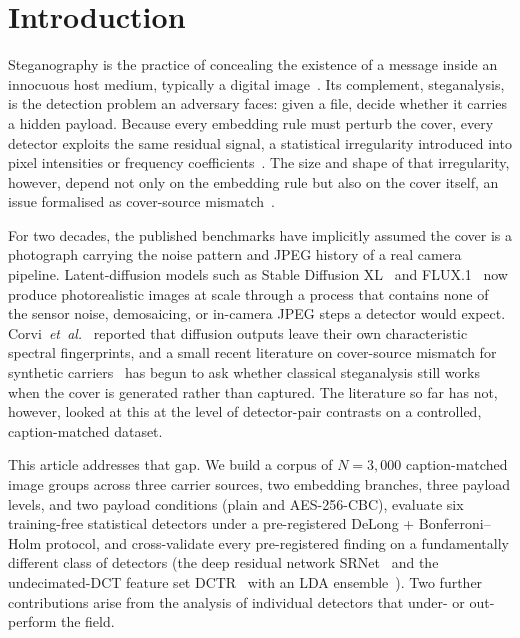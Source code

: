 \documentclass[10pt,twocolumn,a4paper]{article}
\begin{document}
\section{Introduction}
\label{sec:intro}

Steganography is the practice of concealing the existence of a message inside an innocuous host medium, typically a digital image~\cite{petitcolas1999,cheddad2010}. Its complement, steganalysis, is the detection problem an adversary faces: given a file, decide whether it carries a hidden payload. Because every embedding rule must perturb the cover, every detector exploits the same residual signal, a statistical irregularity introduced into pixel intensities or frequency coefficients~\cite{westfeld1999chi,fridrich2001lsb,dumitrescu2003sp}. The size and shape of that irregularity, however, depend not only on the embedding rule but also on the cover itself, an issue formalised as cover-source mismatch~\cite{giboulot2020csm,mallet2024csm}.

For two decades, the published benchmarks have implicitly assumed the cover is a photograph carrying the noise pattern and JPEG history of a real camera pipeline. Latent-diffusion models such as Stable Diffusion XL~\cite{sdxl2023} and FLUX.1~\cite{flux2024} now produce photorealistic images at scale through a process that contains none of the sensor noise, demosaicing, or in-camera JPEG steps a detector would expect. Corvi~\textit{et~al.}~\cite{corvi2023diffusion} reported that diffusion outputs leave their own characteristic spectral fingerprints, and a small recent literature on cover-source mismatch for synthetic carriers~\cite{mereur2024deepfake,mallet2024csm} has begun to ask whether classical steganalysis still works when the cover is generated rather than captured. The literature so far has not, however, looked at this at the level of detector-pair contrasts on a controlled, caption-matched dataset.

This article addresses that gap. We build a corpus of $N\!=\!3{,}000$ caption-matched image groups across three carrier sources, two embedding branches, three payload levels, and two payload conditions (plain and AES-256-CBC), evaluate six training-free statistical detectors under a pre-registered DeLong + Bonferroni--Holm protocol, and cross-validate every pre-registered finding on a fundamentally different class of detectors (the deep residual network SRNet~\cite{boroumand2019srnet} and the undecimated-DCT feature set DCTR~\cite{holub2015dctr} with an LDA ensemble~\cite{fridrich2012srm}). Two further contributions arise from the analysis of individual detectors that under- or out-perform the field.
\end{document}
